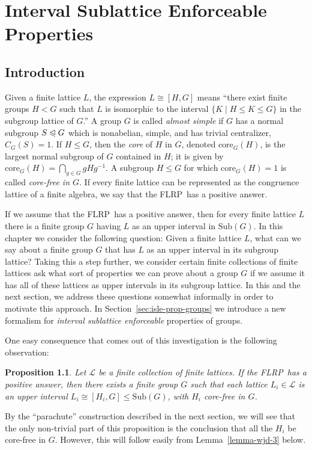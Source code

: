 \documentclass[cm,dissertation,actual,final]{uhthesis}
\theoremstyle{plain}
\newtheorem{prop}[theorem]{Proposition}
\theoremstyle{definition}
\theoremstyle{remark}
\numberwithin{theorem}{section}
\numberwithin{claim}{chapter}
\numberwithin{equation}{section}
\numberwithin{conjecture}{chapter}
\newcommand{\<}{\ensuremath{\langle}}
\renewcommand{\>}{\ensuremath{\rangle}}
\renewcommand{\leq}{\ensuremath{\leqslant}}
\newcommand{\subnormal}{\ensuremath{\trianglelefteqslant}}
\newcommand{\Sub}{\ensuremath{\mathrm{Sub}}}
\newcommand{\core}{\ensuremath{\mathrm{core}}}
\newcommand{\FLRP}{{\small FLRP}}
\newcommand{\0}{\ensuremath{\mathbf{0}}}
\newcommand{\1}{\ensuremath{\mathbf{1}}}
\newcommand{\2}{\ensuremath{\mathbf{2}}}
\newcommand{\3}{\ensuremath{\mathbf{3}}}
\newcommand{\4}{\ensuremath{\mathbf{4}}}
\newcommand{\5}{\ensuremath{\mathbf{5}}}
\newcommand{\sL}{\ensuremath{\mathscr{L}}}
\begin{document}
\chapter{Interval Sublattice Enforceable Properties}
\label{cha:subl-interv-enforc}
\section{Introduction}
Given a finite lattice $L$, the
expression $L \cong [H, G]$ means ``there exist finite groups $H < G$ such that 
$L$ is isomorphic to the interval $\{K \mid H\leq K \leq G\}$ in
the subgroup lattice of $G$.''  
A group $G$ is called \emph{almost simple} if $G$ has a normal subgroup $S \subnormal
G$ which is nonabelian, simple, and has trivial centralizer, $C_G(S) = 1$.
If $H \leq G$, then the
\emph{core} of $H$ in $G$, denoted $\core_G(H)$, is the largest normal subgroup of $G$
contained in $H$; it is given by  $\core_G(H) = \bigcap\limits_{g\in G} gHg^{-1}$.
A subgroup $H\leq G$ for which $\core_G(H)=1$ is called \emph{core-free in $G$}.
If every finite lattice can be represented as the congruence lattice of a finite
algebra, we say that the \FLRP\ has a positive answer.

If we assume that the \FLRP\ has a positive answer, then for every finite
lattice $L$ there is a finite group $G$ having $L$ as an upper interval in
$\Sub(G)$. 
In this chapter we consider the following question: Given a finite lattice $L$,
what can we say about a finite group $G$ that has  $L$
as an upper interval in its subgroup lattice?
Taking this a step further, we consider certain finite collections of finite 
lattices ask what sort of properties we can prove about a
group $G$ if we assume it has all of these lattices as 
upper intervals in its subgroup lattice.  In this and the next section, we
address these questions somewhat informally in order to motivate this
approach. In Section~\ref{sec:isle-prop-groups} we introduce a 
new formalism for \emph{interval sublattice enforceable} properties of
groups. 

One easy consequence that comes out of this investigation is the following observation:
\begin{prop}
\label{prop:parachute}
  Let $\sL$ be a finite collection of finite lattices.
  If the \FLRP\ has a positive answer, then there exists a finite group $G$ such
  that each lattice $L_i \in \sL$ is an upper interval $L_i\cong [H_i, G] \leq
  \Sub(G)$, with $H_i$ core-free in $G$. 
\end{prop}
By the ``parachute'' construction described in the next section,
we will see that the only non-trivial part of this proposition is the conclusion
that all the $H_i$ be core-free in $G$.  However, this will follow easily from
Lemma~\ref{lemma-wjd-3} below.  
\end{document}
